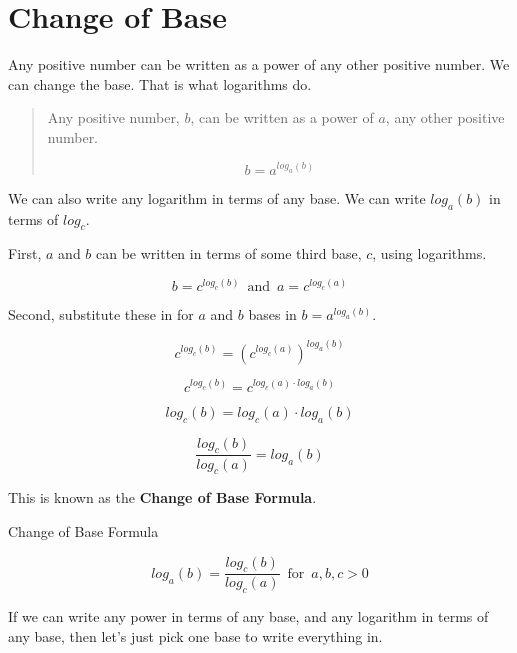 \documentclass{ximera}
\begin{document}
\section{Change of Base}


Any positive number can be written as a power of any other positive number.  We can change the base. That is what logarithms do.


\begin{quote}

Any positive number, $b$, can be written as a power of $a$, any other positive number.

\[    b = a^{log_a(b)}  \]

\end{quote}

We can also write any logarithm in terms of any base.  We can write $log_a(b)$ in terms of $log_c$.




First, $a$ and $b$ can be written in terms of some third base, $c$, using logarithms.


\[    b = c^{log_c(b)} \,   \text{ and } \,      a = c^{log_c(a)}      \]



Second, substitute these in for $a$ and $b$ bases in $b = a^{log_a(b)}$.



\[   c^{log_c(b)} = \left(c^{log_c(a)}\right)^{log_a(b)}  \]



\[   c^{log_c(b)} = c^{log_c(a) \cdot log_a(b)}  \]



\[   log_c(b) = log_c(a) \cdot log_a(b)  \]


\[   \frac{log_c(b)}{log_c(a)} =  log_a(b)  \]


This is known as the \textbf{Change of Base Formula}.








\begin{fact}  Change of Base Formula

\[   log_a(b)  =  \frac{log_c(b)}{log_c(a)}        \, \text{ for } \, a, b, c  > 0        \]


\end{fact}









If we can write any power in terms of any base, and any logarithm in terms of any base, then let's just pick one base to write everything in.
\end{document}
